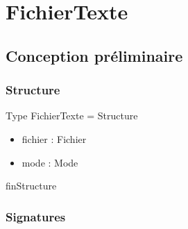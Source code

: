 \documentclass{article}
\begin{document}
    \pagestyle{empty}
    \noindent

    \section*{FichierTexte}
    \subsection*{Conception préliminaire}
    \subsubsection*{Structure}

    Type FichierTexte = Structure
	\begin{itemize}[label=$\ $, leftmargin=2cm]
		 \item fichier : Fichier
		 \item mode : Mode
	\end{itemize}
    finStructure
    
    \subsubsection*{Signatures}
\end{document}
